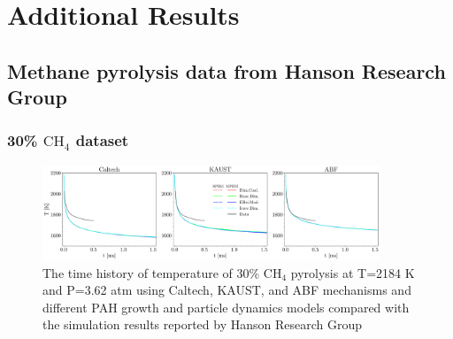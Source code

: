 \chapter{Additional Results}
\label{apps:addresults}

\section{Methane pyrolysis data from Hanson Research Group}

\subsection{30\% $\mathrm{CH_4}$ dataset}

\begin{figure}[H]
	\centering
	\includegraphics[width=0.9\textwidth]{Figures/Results/Shocktube/Stanford/june/stsh_mech_compare_T.pdf}
	\caption{The time history of temperature of 30\% $\mathrm{CH_4}$ pyrolysis at T=2184 K and P=3.62 atm using Caltech, KAUST, and ABF mechanisms and different PAH growth and particle dynamics models compared with the simulation results reported by Hanson Research Group}
	\label{fig:shocktubestT} 
\end{figure}


